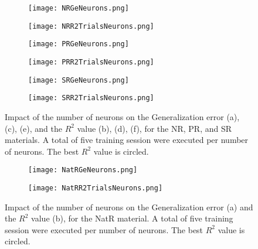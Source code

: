 \begin{figure}[htbp!]
	\centering
    \begin{subfigure}[b]{0.49\textwidth}
        \centering
        \texttt{[image: NRGeNeurons.png]}
        \caption{}
        \label{fig:GenNeuronsNR}
    \end{subfigure}
    \begin{subfigure}[b]{0.49\textwidth}
        \centering
        \texttt{[image: NRR2TrialsNeurons.png]}
        \caption{}
        \label{fig:TrialsNeuronsNR}
    \end{subfigure}
    \begin{subfigure}[b]{0.49\textwidth}
        \centering
        \texttt{[image: PRGeNeurons.png]}
        \caption{}
        \label{fig:GenNeuronsPR}
    \end{subfigure}
    \begin{subfigure}[b]{0.49\textwidth}
        \centering
        \texttt{[image: PRR2TrialsNeurons.png]}
        \caption{}
        \label{fig:TrialsNeuronsPR}
    \end{subfigure}
    \begin{subfigure}[b]{0.49\textwidth}
        \centering
        \texttt{[image: SRGeNeurons.png]}
        \caption{}
        \label{fig:GenNeuronsSR}
    \end{subfigure}
    \begin{subfigure}[b]{0.49\textwidth}
        \centering
        \texttt{[image: SRR2TrialsNeurons.png]}
        \caption{}
        \label{fig:TrialsNeuronsSR}
    \end{subfigure}
    \caption{Impact of the number of neurons on the Generalization error (a), (c), (e), and the $R^2$ value (b), (d), (f), for the NR, PR, and SR materials. A total of five training session were executed per number of neurons. The best $R^2$ value is circled.}
    \label{fig:TrialsNeurons2}
\end{figure}

\begin{figure}[htbp!]
	\centering
    \begin{subfigure}[b]{0.49\textwidth}
        \centering
        \texttt{[image: NatRGeNeurons.png]}
        \caption{}
        \label{fig:GenNeuronsNatR}
    \end{subfigure}
    \begin{subfigure}[b]{0.49\textwidth}
        \centering
        \texttt{[image: NatRR2TrialsNeurons.png]}
        \caption{}
        \label{fig:TrialsNeuronsNatR}
    \end{subfigure}
    \caption{Impact of the number of neurons on the Generalization error (a) and the $R^2$ value (b), for the NatR material. A total of five training session were executed per number of neurons. The best $R^2$ value is circled.}
    \label{fig:TrialsNeurons3}
\end{figure}

